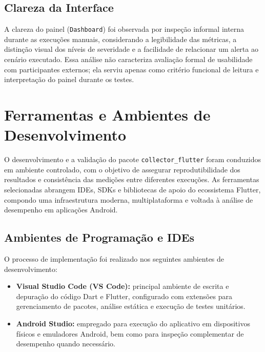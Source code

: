 \subsection{Clareza da Interface}

A clareza do painel (\texttt{Dashboard}) foi observada por inspeção informal interna durante as execuções manuais, considerando a legibilidade das métricas, a distinção visual dos níveis de severidade e a facilidade de relacionar um alerta ao cenário executado. Essa análise não caracteriza avaliação formal de usabilidade com participantes externos; ela serviu apenas como critério funcional de leitura e interpretação do painel durante os testes.






\section{Ferramentas e Ambientes de Desenvolvimento}

O desenvolvimento e a validação do pacote \texttt{collector\_flutter} foram conduzidos em ambiente controlado, com o objetivo de assegurar reprodutibilidade dos resultados e consistência das medições entre diferentes execuções.
As ferramentas selecionadas abrangem IDEs, SDKs e bibliotecas de apoio do ecossistema Flutter, compondo uma infraestrutura moderna, multiplataforma e voltada à análise de desempenho em aplicações Android.

\subsection{Ambientes de Programação e IDEs}

O processo de implementação foi realizado nos seguintes ambientes de desenvolvimento:

\begin{itemize}
  \item \textbf{Visual Studio Code (VS Code):} principal ambiente de escrita e depuração do código Dart e Flutter, configurado com extensões para gerenciamento de pacotes, análise estática e execução de testes unitários.
  \item \textbf{Android Studio:} empregado para execução do aplicativo em dispositivos físicos e emuladores Android, bem como para inspeção complementar de desempenho quando necessário.
\end{itemize}

